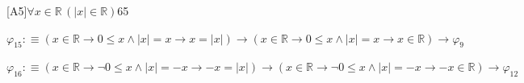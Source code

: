\begin{fullproof}{[A5]}{$\forall x \in \mathbb{R}\,(\lvert x \rvert \in \mathbb{R})$}{65}
\begin{abbrevlist}
\item $\varphi_{15} :\equiv (x \in \mathbb{R} \to 0 \leq x \land \lvert x \rvert = x \to x = \lvert x \rvert) \to (x \in \mathbb{R} \to 0 \leq x \land \lvert x \rvert = x \to x \in \mathbb{R}) \to \varphi_{9}$
\item $\varphi_{16} :\equiv (x \in \mathbb{R} \to \neg 0 \leq x \land \lvert x \rvert = -x \to -x = \lvert x \rvert) \to (x \in \mathbb{R} \to \neg 0 \leq x \land \lvert x \rvert = -x \to -x \in \mathbb{R}) \to \varphi_{12}$
\end{abbrevlist}
\end{fullproof}
